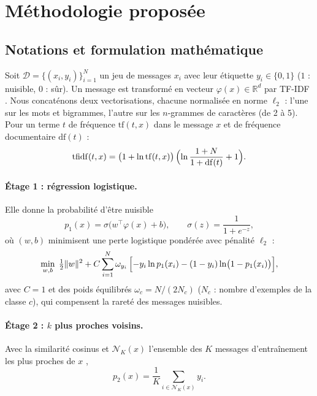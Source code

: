 \documentclass[a4paper,fleqn]{cas-sc}
\begin{document}
\section{Méthodologie proposée}
\label{sec:metho}

\subsection{Notations et formulation mathématique}

Soit $\mathcal{D} = \{(x_i, y_i)\}_{i=1}^{N}$ un jeu de messages $x_i$ avec leur étiquette
$y_i \in \{0,1\}$ ($1$ : nuisible, $0$ : sûr). Un message est transformé en vecteur
$\varphi(x) \in \mathbb{R}^{d}$ par TF-IDF \citep{Salton1988}. Nous concaténons deux vectorisations,
chacune normalisée en norme $\ell_2$ : l'une sur les mots et bigrammes, l'autre sur les $n$-grammes de
caractères (de 2 à 5). Pour un terme $t$ de fréquence $\mathrm{tf}(t,x)$ dans le message $x$ et de
fréquence documentaire $\mathrm{df}(t)$ :
\begin{equation}
\mathrm{tfidf}(t,x) = \bigl(1 + \ln \mathrm{tf}(t,x)\bigr)\,\Bigl(\ln\frac{1+N}{1+\mathrm{df}(t)} + 1\Bigr).
\end{equation}

\paragraph{Étage 1 : régression logistique.} Elle donne la probabilité d'être nuisible
\begin{equation}
p_1(x) = \sigma\bigl(w^{\top}\varphi(x) + b\bigr), \qquad \sigma(z) = \frac{1}{1+e^{-z}},
\label{eq:rl}
\end{equation}
où $(w,b)$ minimisent une perte logistique pondérée avec pénalité $\ell_2$ :
\begin{equation}
\min_{w,b}\; \tfrac{1}{2}\lVert w\rVert^{2} + C\sum_{i=1}^{N} \omega_{y_i}\,\Bigl[-y_i\ln p_1(x_i) - (1-y_i)\ln\bigl(1-p_1(x_i)\bigr)\Bigr],
\label{eq:loss}
\end{equation}
avec $C=1$ et des poids équilibrés $\omega_c = N/(2N_c)$ ($N_c$ : nombre d'exemples de la classe $c$), qui
compensent la rareté des messages nuisibles.

\paragraph{Étage 2 : $k$ plus proches voisins.} Avec la similarité cosinus et $\mathcal{N}_K(x)$ l'ensemble
des $K$ messages d'entraînement les plus proches de $x$ \citep{CoverHart1967},
\begin{equation}
p_2(x) = \frac{1}{K}\sum_{i\in\mathcal{N}_K(x)} y_i .
\label{eq:knn}
\end{equation}
\end{document}
